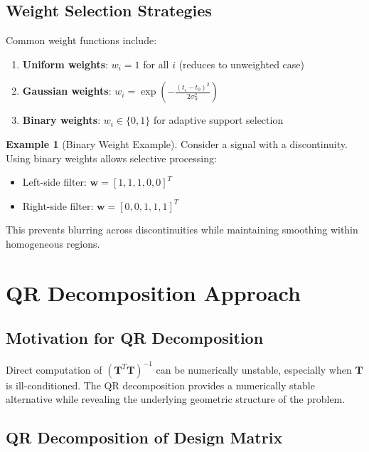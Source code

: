 \documentclass[12pt]{article}
\renewcommand{\vec}[1]{\mathbf{#1}}
\newcommand{\mat}[1]{\mathbf{#1}}
\theoremstyle{definition}
\newtheorem{example}[theorem]{Example}
\begin{document}
\subsection{Weight Selection Strategies}
\label{subsec:weight_selection}

Common weight functions include:

\begin{enumerate}
    \item \textbf{Uniform weights}: $w_i = 1$ for all $i$ (reduces to unweighted case)
    \item \textbf{Gaussian weights}: $w_i = \exp(-\frac{(t_i - t_0)^2}{2\sigma_w^2})$
    \item \textbf{Binary weights}: $w_i \in \{0, 1\}$ for adaptive support selection
\end{enumerate}

\begin{example}[Binary Weight Example]
    \label{ex:binary_weights}
    Consider a signal with a discontinuity. Using binary weights allows selective processing:
    \begin{itemize}
        \item Left-side filter: $\vec{w} = [1, 1, 1, 0, 0]^T$
        \item Right-side filter: $\vec{w} = [0, 0, 1, 1, 1]^T$
    \end{itemize}
    This prevents blurring across discontinuities while maintaining smoothing within homogeneous regions.
\end{example}

\newpage

\section{QR Decomposition Approach}
\label{sec:qr_decomposition}

\subsection{Motivation for QR Decomposition}
\label{subsec:qr_motivation}

Direct computation of $(\mat{T}^T\mat{T})^{-1}$ can be numerically unstable, especially when $\mat{T}$ is ill-conditioned. The QR decomposition provides a numerically stable alternative while revealing the underlying geometric structure of the problem.

\subsection{QR Decomposition of Design Matrix}
\label{subsec:qr_decomp}
\end{document}
